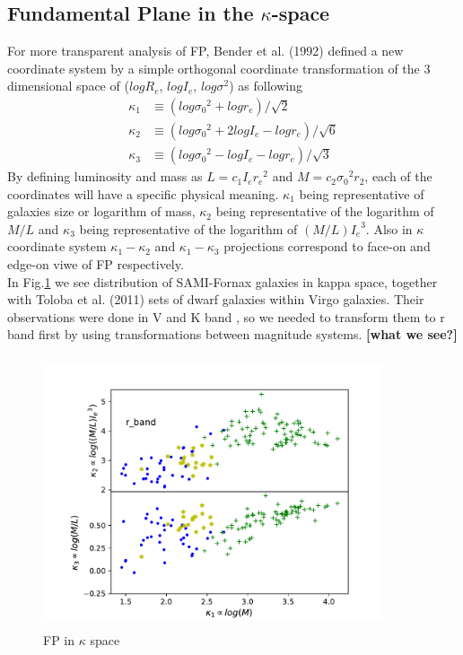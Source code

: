 \documentclass{aa}
\begin{document}
\subsection{Fundamental Plane in the $\kappa$-space}
For more transparent analysis of FP, Bender et al. (1992) defined a new coordinate system by a simple orthogonal coordinate transformation of the 3 dimensional space of ($logR_e$, $logI_e$, $log\sigma^2$) as following
\begin{align}
\kappa_1 &\equiv(log{\sigma_0}^2+log r_e)/\sqrt{2} \\
\kappa_2 &\equiv(log{\sigma_0}^2+2logI_e-log r_e)/\sqrt{6} \\
\kappa_3 &\equiv(log{\sigma_0}^2-log I_e-log r_e)/\sqrt{3}
\end{align}
By defining luminosity and mass as $L=c_1I_e{r_e}^2$ and $M=c_2{\sigma_0}^2r_2$, each of the coordinates will have a specific physical meaning. $\kappa_1$ being representative of galaxies size or logarithm of mass, $\kappa_2$ being representative of the logarithm of $M/L$ and $\kappa_3$ being representative of the logarithm of $(M/L){I_e}^3$. Also in $\kappa$ coordinate system $\kappa_1-\kappa_2$ and $\kappa_1-\kappa_3$ projections correspond to face-on and edge-on viwe of FP respectively.\\
In Fig.\ref{fig:FPkappa} we see distribution of SAMI-Fornax galaxies in kappa space, together with Toloba et al. (2011) sets of dwarf galaxies within Virgo galaxies. Their observations were done in V and K band , so we needed to transform them to r band first by using transformations between magnitude systems. 
 \textbf{[what we see?]}
\begin{figure}[!htb]
   \centering
   \includegraphics[width=10cm,height=8cm,keepaspectratio]
   {../2_pipeline/2_FP_kappa+Liter/FP_kappa+Liter_DWARF.pdf}
         \caption{FP in $\kappa$ space}
         \label{fig:FPkappa}
\end{figure}
\end{document}
